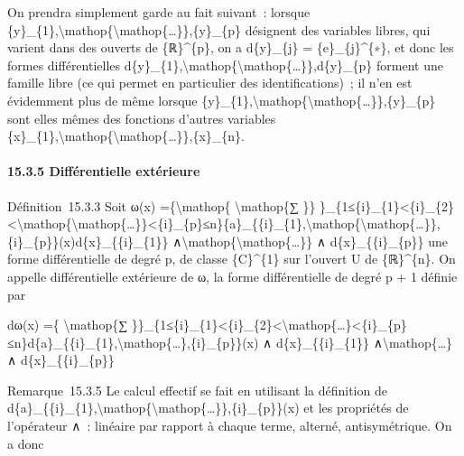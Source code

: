 \documentclass[]{article}
\begin{document}
On prendra simplement garde au fait suivant~: lorsque
\{y\}\_\{1\},\textbackslash{}mathop\{\textbackslash{}mathop\{\ldots{}\}\},\{y\}\_\{p\}
désignent des variables libres, qui varient dans des ouverts de
\{ℝ\}\^{}\{p\}, on a d\{y\}\_\{j\} = \{e\}\_\{j\}\^{}\{∗\}, et donc les
formes différentielles
d\{y\}\_\{1\},\textbackslash{}mathop\{\textbackslash{}mathop\{\ldots{}\}\},d\{y\}\_\{p\}
forment une famille libre (ce qui permet en particulier des
identifications)~; il n'en est évidemment plus de même lorsque
\{y\}\_\{1\},\textbackslash{}mathop\{\textbackslash{}mathop\{\ldots{}\}\},\{y\}\_\{p\}
sont elles mêmes des fonctions d'autres variables
\{x\}\_\{1\},\textbackslash{}mathop\{\textbackslash{}mathop\{\ldots{}\}\},\{x\}\_\{n\}.

\paragraph{15.3.5 Différentielle extérieure}

Définition~15.3.3 Soit ω(x) =\{\textbackslash{}mathop\{
\textbackslash{}mathop\{∑ \}\}
\}\_\{1≤\{i\}\_\{1\}\textless{}\{i\}\_\{2\}\textless{}\textbackslash{}mathop\{\textbackslash{}mathop\{\ldots{}\}\}\textless{}\{i\}\_\{p\}≤n\}\{a\}\_\{\{i\}\_\{1\},\textbackslash{}mathop\{\textbackslash{}mathop\{\ldots{}\}\},\{i\}\_\{p\}\}(x)d\{x\}\_\{\{i\}\_\{1\}\}
∧\textbackslash{}mathop\{\textbackslash{}mathop\{\ldots{}\}\} ∧
d\{x\}\_\{\{i\}\_\{p\}\} une forme différentielle de degré p, de classe
\{C\}\^{}\{1\} sur l'ouvert U de \{ℝ\}\^{}\{n\}. On appelle
différentielle extérieure de ω, la forme différentielle de degré p + 1
définie par

dω(x) =\{ \textbackslash{}mathop\{∑
\}\}\_\{1≤\{i\}\_\{1\}\textless{}\{i\}\_\{2\}\textless{}\textbackslash{}mathop\{\ldots{}\}\textless{}\{i\}\_\{p\}≤n\}d\{a\}\_\{\{i\}\_\{1\},\textbackslash{}mathop\{\ldots{}\},\{i\}\_\{p\}\}(x)
∧ d\{x\}\_\{\{i\}\_\{1\}\} ∧\textbackslash{}mathop\{\ldots{}\} ∧
d\{x\}\_\{\{i\}\_\{p\}\}

Remarque~15.3.5 Le calcul effectif se fait en utilisant la définition de
d\{a\}\_\{\{i\}\_\{1\},\textbackslash{}mathop\{\textbackslash{}mathop\{\ldots{}\}\},\{i\}\_\{p\}\}(x)
et les propriétés de l'opérateur ∧~: linéaire par rapport à chaque
terme, alterné, antisymétrique. On a donc
\end{document}
